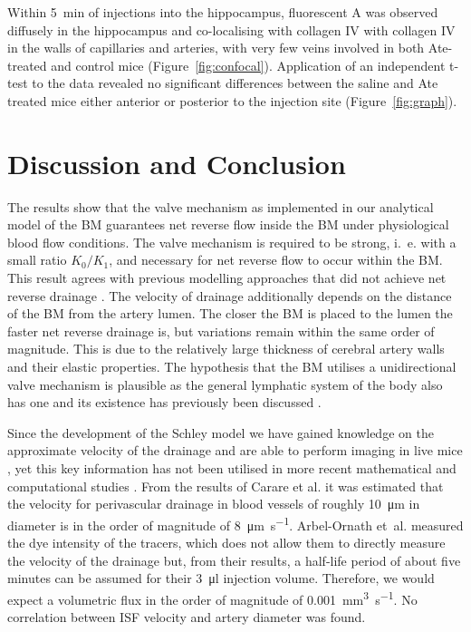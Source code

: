\documentclass{frontiersFPHY} %
\newcommand{\Ab}{A\textbeta\xspace}
\newcommand{\ie}{i.~e.\xspace}
\begin{document}
Within \SI{5}{\minute} of injections into the hippocampus, fluorescent \Ab was observed diffusely in the hippocampus and co-localising with collagen IV with collagen IV in the walls of capillaries and arteries, with very few veins involved in both Ate-treated and control mice (Figure~\ref{fig:confocal}). Application of an independent t-test to the data revealed no significant differences between the saline and Ate treated mice either anterior or posterior to the injection site (Figure~\ref{fig:graph}).  

\section{Discussion and Conclusion}

The results show that the valve mechanism as implemented in our analytical model of the BM guarantees net reverse flow inside the BM under physiological blood flow conditions. The valve mechanism is required to be strong, \ie with a small ratio $K_0/K_1$, and necessary for net reverse flow to occur within the BM. This result agrees with previous modelling approaches that did not achieve net reverse drainage \cite{Schley2006,Wang2011}. The velocity of drainage additionally depends on the distance of the BM from the artery lumen. The closer the BM is placed to the lumen the faster net reverse drainage is, but variations remain within the same order of magnitude. This is due to the relatively large thickness of cerebral artery walls and their elastic properties. The hypothesis that the BM utilises a unidirectional valve mechanism is plausible as the general lymphatic system of the body also has one and its existence has previously been discussed \cite{Weller2010,Schley2006,Heppell2013}.

Since the development of the Schley model we have gained knowledge on the approximate velocity of the drainage and are able to perform imaging in live mice \cite{Carare2008,Schley2006,Arbel-Ornath2013}, yet this key information has not been utilised in more recent mathematical and computational studies \cite{Wang2011,Sharp2015}. From the results of Carare et al. \cite{Carare2008} it was estimated that the velocity for perivascular drainage in blood vessels of roughly \SI{10}{\micro\metre} in diameter is in the order of magnitude of \SI{8}{\micro\metre\per\second}. Arbel-Ornath et~al. \cite{Arbel-Ornath2013} measured the dye intensity of the tracers, which does not allow them to directly measure the velocity of the drainage but, from their results, a half-life period of about five minutes can be assumed for their \SI{3}{\micro\litre} injection volume. Therefore, we would expect a volumetric flux in the order of magnitude of \SI{0.001}{\cubic\milli\metre\per\second}. No correlation between ISF velocity and artery diameter was found.
\end{document}
